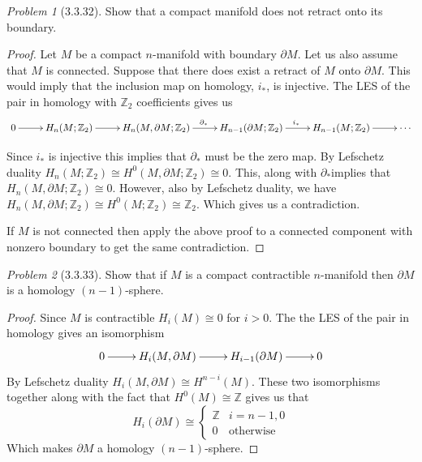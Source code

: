 \documentclass[10pt]{article}
\newcommand{\sk}{\vskip 10mm}
\newcommand{\bb}[1]{\mathbb{#1}}
\theoremstyle{remark}
\newtheorem{problem}{Problem}
\begin{document}
\sk

\begin{problem}[3.3.32]
  Show that a compact manifold does not retract onto its boundary.
\end{problem}

\begin{proof}
  Let $M$ be a compact $n$-manifold with boundary $\partial M$. Let us also assume
  that $M$ is connected. Suppose that there does exist a retract of $M$ onto $\partial M$.
  This would imply that the inclusion map on homology, $i_*$, is injective.
  The LES of the pair in homology with $\bb{Z}_2$ coefficients gives us
  \[
    \xymatrix{
      0 \ar[r] & H_n(M;\bb{Z}_2) \ar[r] & H_n(M,\partial M;\bb{Z}_2)\ar[r]^{\partial_*} & H_{n-1}(\partial M;\bb{Z}_2) \ar[r]^{i_*} & H_{n-1}(M;\bb{Z}_2)\ar[r] &\cdots
    }
  \]

  Since $i_*$ is injective this implies that $\partial_*$ must be the zero map.
  By Lefschetz duality $H_n(M;\bb{Z}_2)\cong H^0(M,\partial M;\bb{Z}_2)\cong 0$. This, along with
  $\partial_*$implies
  that $H_n(M,\partial M;\bb{Z}_2)\cong 0$. However, also by Lefschetz duality, we have
  $H_n(M,\partial M;\bb{Z}_2)\cong H^0(M;\bb{Z}_2)\cong \bb{Z}_2$. Which gives us a contradiction.

  If $M$ is not connected then apply the above proof to a connected component
  with nonzero boundary to get the same contradiction.
\end{proof}

\sk

\begin{problem}[3.3.33]
  Show that if $M$ is a compact contractible $n$-manifold then $\partial M$ is a
  homology $(n-1)$-sphere.
\end{problem}

\begin{proof}
  Since $M$ is contractible $H_i(M)\cong 0$ for $i>0$. The the LES of the pair in
  homology gives an isomorphism
  \[
    \xymatrix{
      0 \ar[r] & H_i(M,\partial M) \ar[r] & H_{i-1}(\partial M) \ar[r] & 0
    }
  \]
  By Lefschetz duality $H_i(M,\partial M)\cong H^{n-i}(M)$. These two isomorphisms together
  along with the fact that $H^0(M)\cong \bb{Z}$ gives us that
  \[
    H_i(\partial M) \cong
    \left\{
      \begin{array}{lr}
        \bb{Z} & i=n-1,0\\
        0 & \text{otherwise}
      \end{array}
    \right.
  \]
  Which makes $\partial M$ a homology $(n-1)$-sphere.
\end{proof}
\end{document}
